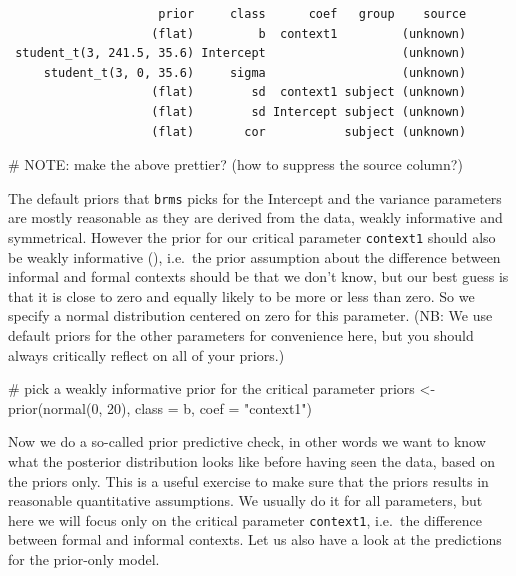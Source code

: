 \documentclass[
  doc,
  floatsintext,
  longtable,
  nolmodern,
  notxfonts,
  notimes,
  colorlinks=true,linkcolor=blue,citecolor=blue,urlcolor=blue]{apa7}
\newenvironment{Shaded}{\begin{snugshade}}{\end{snugshade}}
\newcommand{\AlertTok}[1]{\textcolor[rgb]{0.68,0.00,0.00}{#1}}
\newcommand{\AttributeTok}[1]{\textcolor[rgb]{0.40,0.45,0.13}{#1}}
\newcommand{\CommentTok}[1]{\textcolor[rgb]{0.37,0.37,0.37}{#1}}
\newcommand{\DecValTok}[1]{\textcolor[rgb]{0.68,0.00,0.00}{#1}}
\newcommand{\FunctionTok}[1]{\textcolor[rgb]{0.28,0.35,0.67}{#1}}
\newcommand{\NormalTok}[1]{\textcolor[rgb]{0.00,0.23,0.31}{#1}}
\newcommand{\OtherTok}[1]{\textcolor[rgb]{0.00,0.23,0.31}{#1}}
\newcommand{\StringTok}[1]{\textcolor[rgb]{0.13,0.47,0.30}{#1}}
\begin{document}
\begin{verbatim}
                     prior     class      coef   group    source
                    (flat)         b  context1         (unknown)
 student_t(3, 241.5, 35.6) Intercept                   (unknown)
     student_t(3, 0, 35.6)     sigma                   (unknown)
                    (flat)        sd  context1 subject (unknown)
                    (flat)        sd Intercept subject (unknown)
                    (flat)       cor           subject (unknown)
\end{verbatim}

\begin{Shaded}
\begin{Highlighting}[]
\CommentTok{\# }\AlertTok{NOTE}\CommentTok{: make the above prettier? (how to suppress the \textasciigrave{}source\textasciigrave{} column?)}
\end{Highlighting}
\end{Shaded}

The default priors that \texttt{brms} picks for the Intercept and the
variance parameters are mostly reasonable as they are derived from the
data, weakly informative and symmetrical. However the prior for our
critical parameter \texttt{context1} should also be weakly informative
(), i.e.~the prior assumption about the difference between informal
and formal contexts should be that we don't know, but our best guess is
that it is close to zero and equally likely to be more or less than
zero. So we specify a normal distribution centered on zero for this
parameter. (NB: We use default priors for the other parameters for
convenience here, but you should always critically reflect on all of
your priors.)

\begin{Shaded}
\begin{Highlighting}[]
\CommentTok{\# pick a weakly informative prior for the critical parameter}
\NormalTok{priors }\OtherTok{\textless{}{-}} \FunctionTok{prior}\NormalTok{(}\FunctionTok{normal}\NormalTok{(}\DecValTok{0}\NormalTok{, }\DecValTok{20}\NormalTok{), }
                \AttributeTok{class =}\NormalTok{ b, }
                \AttributeTok{coef =} \StringTok{"context1"}\NormalTok{)}
\end{Highlighting}
\end{Shaded}

Now we do a so-called prior predictive check, in other words we want to
know what the posterior distribution looks like before having seen the
data, based on the priors only. This is a useful exercise to make sure
that the priors results in reasonable quantitative assumptions. We
usually do it for all parameters, but here we will focus only on the
critical parameter \texttt{context1}, i.e.~the difference between formal
and informal contexts. Let us also have a look at the predictions for
the prior-only model.
\end{document}
